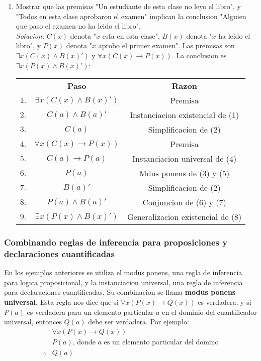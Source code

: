 \documentclass[]{article}
\begin{document}
\begin{enumerate}
	\item Mostrar que las premisas "Un estudiante de esta clase no leyo el libro", y "Todos en esta clase aprobaron el examen" implican la conclusion "Alguien que paso el examen no ha leido el libro".\\
	\textit{Solucion:} $C(x)$ denota "$x$ esta en esta clase", $B(x)$ denota "$x$ ha leido el libro", y $P(x)$ denota "$x$ aprobo el primer examen". Las premisas son $\exists x (C(x) \wedge B(x)')$ y $\forall x(C(x) \rightarrow P(x))$. La conclusion es $\exists x(P(x) \wedge B(x)')$:
	\begin{table}[H]
		\begin{center}
			\begin{tabular}{ c c c }
				& \textbf{Paso} & \textbf{Razon}\\
				$1.$ & $\exists x(C(x) \wedge B(x)')$ & Premisa\\
				$2.$ & $C(a) \wedge B(a)'$ & Instanciacion existencial de (1)\\
				$3.$ & $C(a)$ & Simplificacion de (2)\\
				$4.$ & $\forall x(C(x) \rightarrow P(x))$ & Premisa\\
				$5.$ & $C(a) \rightarrow P(a)$ & Instanciacion universal de (4)\\
				$6.$ & $P(a)$ & Mdus ponens de (3) y (5)\\
				$7.$ & $B(a)'$ & Simplificacion de (2)\\
				$8.$ & $P(a) \wedge B(a)'$ & Conjuncion de (6) y (7)\\
				$9.$ & $\exists x(P(x) \wedge B(x)')$ & Generalizacion existencial de (8)
			\end{tabular}
		\end{center}
	\end{table}
\end{enumerate}

\subsubsection*{Combinando reglas de inferencia para proposiciones y declaraciones cuantificadas}

En los ejemplos anteriores se utiliza el modus ponens, una regla de inferencia para logica proposicional, y la instanciacion universal, una regla de inferencia para declaraciones cuantificadas. Su combinacion se llama \textbf{modus ponens universal}. Esta regla nos dice que si $\forall x (P(x) \rightarrow Q(x))$ es verdadera, y si $P(a)$ es verdadera para un elemento particular $a$ en el dominio del cuantificador universal, entonces $Q(a)$ debe ser verdadera. Por ejemplo:
\begin{equation*}
	\begin{aligned}
		&\forall x(P(x) \rightarrow Q(x))\\
		&P(a)\text{, donde $a$ es un elemento particular del domino}\\
		\therefore &Q(a)
	\end{aligned}
\end{equation*}
\end{document}
